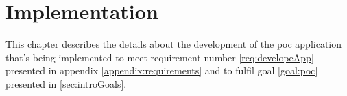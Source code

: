 \chapter{Implementation}\label{impl}
This chapter describes the details about the development of the \acrfull{poc} application that's being implemented to meet requirement number \ref{req:developeApp} presented in appendix \ref{appendix:requirements} and to fulfil goal \ref{goal:poc} presented in \cref{sec:introGoals}.





